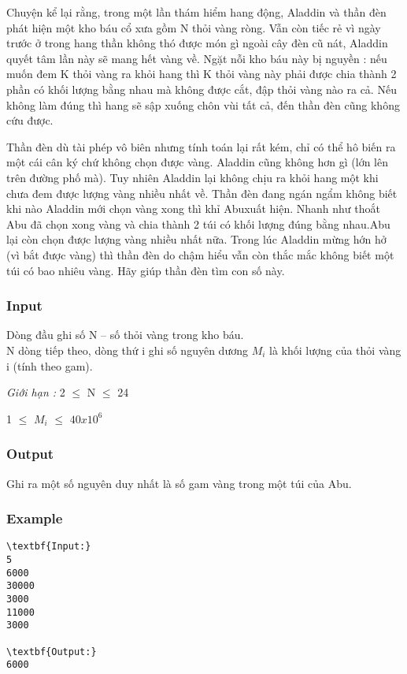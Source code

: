 

Chuyện kể lại rằng, trong một lần thám hiểm hang động, Aladdin và thần đèn phát hiện một kho báu cổ xưa gồm N thỏi vàng ròng. Vẫn còn tiếc rẻ vì ngày trước ở trong hang thần không thó được món gì ngoài cây đèn cũ nát, Aladdin quyết tâm lần này sẽ mang hết vàng về. Ngặt nỗi kho báu này bị nguyền : nếu muốn đem K thỏi vàng ra khỏi hang thì K thỏi vàng này phải được chia thành 2 phần có khối lượng bằng nhau mà không được cắt, đập thỏi vàng nào ra cả. Nếu không làm đúng thì hang sẽ sập xuống chôn vùi tất cả, đến thần đèn cũng không cứu được.

Thần đèn dù tài phép vô biên nhưng tính toán lại rất kém, chỉ có thể hô biến ra một cái cân ký chứ không chọn được vàng. Aladdin cũng không hơn gì (lớn lên trên đường phố mà). Tuy nhiên Aladdin lại không chịu ra khỏi hang một khi chưa đem được lượng vàng nhiều nhất về. Thần đèn đang ngán ngẩm không biết khi nào Aladdin mới chọn vàng xong thì khỉ Abuxuất hiện. Nhanh như thoắt Abu đã chọn xong vàng và chia thành 2 túi có khối lượng đúng bằng nhau.Abu lại còn chọn được lượng vàng nhiều nhất nữa. Trong lúc Aladdin mừng hớn hở (vì bắt được vàng) thì thần đèn do chậm hiểu vẫn còn thắc mắc không biết một túi có bao nhiêu vàng. Hãy giúp thần đèn tìm con số này.

\subsubsection{Input}

Dòng đầu ghi số N – số thỏi vàng trong kho báu.
\\N dòng tiếp theo, dòng thứ i ghi số nguyên dương $M_{i}$ là khối lượng của thỏi vàng i (tính theo gam).

\emph{Giới hạn : } 2  $\le$  N  $\le$  24

1  $\le$  $M_{i}$  $\le$  $40x10^{6}$

\subsubsection{Output}

Ghi ra một số nguyên duy nhất là số gam vàng trong một túi của Abu.

\subsubsection{Example}
\begin{verbatim}
\textbf{Input:}
5
6000
30000
3000
11000
3000

\textbf{Output:}
6000\end{verbatim}
